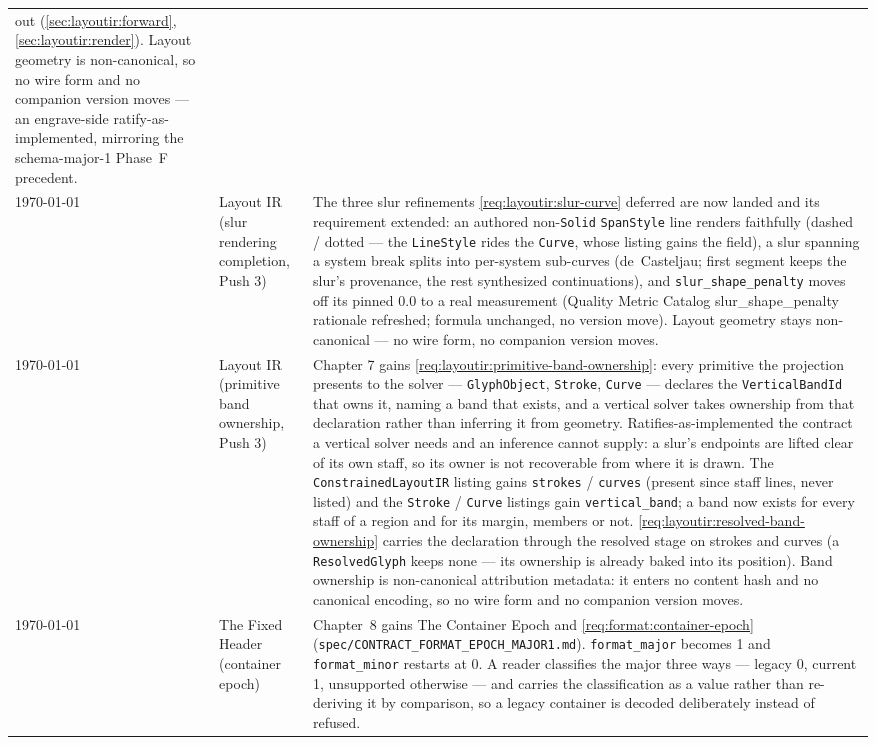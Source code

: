 \documentclass[11pt,letterpaper]{report}
\newcommand{\tablenums}[1]{{\addfontfeatures{Numbers={Lining,Tabular}}#1}}
\newcommand{\sectionsc}[1]{{\addfontfeatures{Letters=SmallCaps}#1}}
\newcounter{requirement}[chapter]
\begin{document}
\begin{longtable}{p{2cm} p{2.5cm} p{9cm}}
  out (\ref{sec:layoutir:forward}, \ref{sec:layoutir:render}). Layout
  geometry is non-canonical, so no wire form and no companion version
  moves --- an engrave-side ratify-as-implemented, mirroring the
  schema-major-1 Phase~F precedent.
  \\
  \today & Layout IR (slur rendering completion, Push 3) &
  The three slur refinements \ref{req:layoutir:slur-curve} deferred are
  now landed and its requirement extended: an authored non-\texttt{Solid}
  \texttt{SpanStyle} line renders faithfully (dashed / dotted --- the
  \texttt{LineStyle} rides the \texttt{Curve}, whose listing gains the
  field), a slur spanning a system break splits into per-system
  sub-curves (de~Casteljau; first segment keeps the slur's provenance,
  the rest synthesized continuations), and \texttt{slur\_shape\_penalty}
  moves off its pinned $0.0$ to a real measurement (Quality Metric
  Catalog \sectionsc{slur\_shape\_penalty} rationale refreshed; formula
  unchanged, no version move). Layout geometry stays non-canonical --- no
  wire form, no companion version moves.
  \\
  \midrule
  \today & Layout IR (primitive band ownership, Push 3) &
  Chapter 7 gains \ref{req:layoutir:primitive-band-ownership}: every
  primitive the projection presents to the solver ---
  \texttt{GlyphObject}, \texttt{Stroke}, \texttt{Curve} --- declares the
  \texttt{VerticalBandId} that owns it, naming a band that exists, and a
  vertical solver takes ownership from that declaration rather than
  inferring it from geometry. Ratifies-as-implemented the contract a
  vertical solver needs and an inference cannot supply: a slur's
  endpoints are lifted clear of its own staff, so its owner is not
  recoverable from where it is drawn. The \texttt{ConstrainedLayoutIR}
  listing gains \texttt{strokes} / \texttt{curves} (present since staff
  lines, never listed) and the \texttt{Stroke} / \texttt{Curve} listings
  gain \texttt{vertical\_band}; a band now exists for every staff of a
  region and for its margin, members or not.
  \ref{req:layoutir:resolved-band-ownership} carries the declaration
  through the resolved stage on strokes and curves (a
  \texttt{ResolvedGlyph} keeps none --- its ownership is already baked
  into its position). Band ownership is non-canonical attribution
  metadata: it enters no content hash and no canonical encoding, so no
  wire form and no companion version moves.
  \\
  \midrule
  \today & The Fixed Header (container epoch) &
  Chapter~8 gains \sectionsc{The Container Epoch} and
  \ref{req:format:container-epoch}
  (\texttt{spec/CONTRACT\_FORMAT\_EPOCH\_MAJOR1.md}).
  \texttt{format\_major} becomes \tablenums{1} and \texttt{format\_minor}
  restarts at \tablenums{0}. A reader classifies the major three ways ---
  legacy \tablenums{0}, current \tablenums{1}, unsupported otherwise ---
  and carries the classification as a value rather than re-deriving it by
  comparison, so a legacy container is decoded deliberately instead of
  refused.


\end{longtable}
\end{document}
